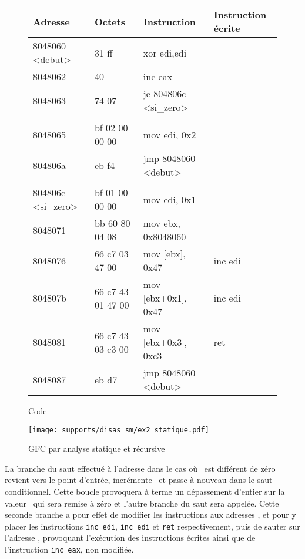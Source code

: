\begin{figure}[h]
\begin{center}
\begin{tabular}[b]{|l|l|l|l|}
\hline
Adresse & Octets & Instruction & Instruction écrite\\ 
\hline
 8048060 <debut>  &  31 ff             &  xor    edi,edi		& \\
 8048062  &  40                        &  inc    eax			& \\
 8048063  &  74 07                     &  je     804806c <si\_zero> 	& \\
 	  &			       &				& \\
 8048065  &  bf 02 00 00 00            &  mov    edi, 0x2 		& \\
 804806a  &  eb f4                     &  jmp    8048060 <debut> 	& \\
	  &			       &				& \\
 804806c <si\_zero> &  bf 01 00 00 00  &  mov    edi, 0x1 		& \\
 8048071  &  bb 60 80 04 08            &  mov    ebx, 0x8048060 	& \\
 8048076  &  66 c7 03 47 00            &  mov    [ebx], 0x47 		& inc edi\\
 804807b  &  66 c7 43 01 47 00         &  mov    [ebx+0x1], 0x47	& inc edi \\
 8048081  &  66 c7 43 03 c3 00         &  mov    [ebx+0x3], 0xc3	& ret \\
 8048087  &  eb d7                     &  jmp    8048060 <debut> 	& \\
\hline
\end{tabular}
\caption{Code \sm}
\label{fig:sm_asm}
\end{center}
\end{figure}

\begin{figure}[h]
\begin{center}
\texttt{[image: supports/disas\_sm/ex2\_statique.pdf]}
\caption{GFC par analyse statique et récursive}
\label{fig:sm_cfg_statique}
\end{center}
\end{figure}


La branche du saut effectué à l'adresse  dans le cas où \eax\ est différent de zéro revient vers le point d'entrée, incrémente \eax\ et passe à nouveau dans le saut conditionnel. Cette boucle provoquera à terme un dépassement d'entier sur la valeur \eax\ qui sera remise à zéro et l'autre branche du saut sera appelée.
Cette seconde branche a pour effet de modifier les instructions aux adresses ,  et  pour y placer les instructions \texttt{inc edi}, \texttt{inc edi} et \texttt{ret} respectivement, puis de sauter sur l'adresse , provoquant l'exécution des instructions écrites ainsi que de l'instruction \texttt{inc eax}, non modifiée.

